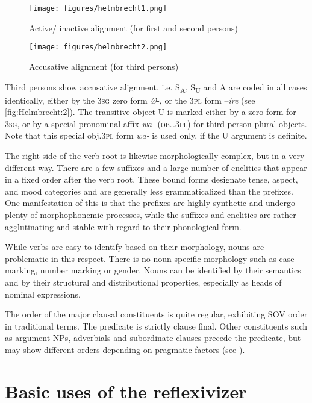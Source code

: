 \documentclass[output=paper]{langscibook}
\begin{document}
\begin{figure}
 \centering
 \texttt{[image: figures/helmbrecht1.png]}
 \caption{Active/ inactive alignment (for first and second persons)}\label{fig:helmbrecht:1}
\end{figure}

\begin{figure}
 \centering
 \texttt{[image: figures/helmbrecht2.png]}
 \caption{Accusative alignment (for third persons)}\label{fig:helmbrecht:2}
\end{figure}


Third persons show accusative alignment, i.e. S\textsubscript{A}, S\textsubscript{U} and A are coded in all cases identically, either by the 3\textsc{sg} zero form \textit{Ø}{}-, or the 3\textsc{pl} form –\textit{ire} (see \ref{fig:Helmbrecht:2}). The transitive object U is marked either by a zero form for 3\textsc{sg}, or by a special pronominal affix \textit{wa-} (\textsc{obj}.3\textsc{pl}) for third person plural objects. Note that this special obj.3\textsc{pl} form \textit{wa-} is used only, if the U argument is definite.

The right side of the verb root is likewise morphologically complex, but in a very different way. There are a few suffixes and a large number of enclitics that appear in a fixed order after the verb root. These bound forms designate tense, aspect, and mood categories and are generally less grammaticalized than the prefixes. One manifestation of this is that the prefixes are highly synthetic and undergo plenty of morphophonemic processes, while the suffixes and enclitics are rather agglutinating and stable with regard to their phonological form.

While verbs are easy to identify based on their morphology, nouns are problematic in this respect. There is no noun-specific morphology such as case marking, number marking or gender. Nouns can be identified by their semantics and by their structural and distributional properties, especially as heads of nominal expressions.

The order of the major clausal constituents is quite regular, exhibiting SOV order in traditional terms. The predicate is strictly clause final. Other constituents such as argument NPs, adverbials and subordinate clauses precede the predicate, but may show different orders depending on pragmatic factors (see \citealt{Helmbrecht2021}). 

\section{Basic uses of the reflexivizer}\label{sec:Helmbrecht:2}
\end{document}
